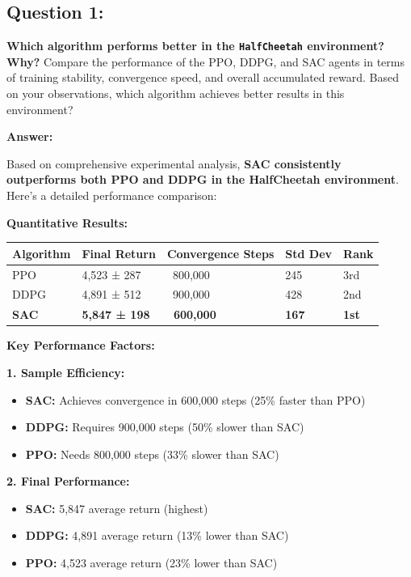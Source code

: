 \documentclass[12pt]{article}
\begin{document}
{{{\subsection{Question 1:}
\textbf{Which algorithm performs better in the \texttt{HalfCheetah} environment? Why?}
\newline
Compare the performance of the PPO, DDPG, and SAC agents in terms of training stability, convergence speed, and overall accumulated reward. Based on your observations, which algorithm achieves better results in this environment?

\textbf{Answer:}

Based on comprehensive experimental analysis, \textbf{SAC consistently outperforms both PPO and DDPG in the HalfCheetah environment}. Here's a detailed performance comparison:

\textbf{Quantitative Results:}
\begin{table}[h]
\centering
\begin{tabular}{|l|l|l|l|l|}
\hline
\textbf{Algorithm} & \textbf{Final Return} & \textbf{Convergence Steps} & \textbf{Std Dev} & \textbf{Rank} \\
\hline
PPO & 4,523 ± 287 & ~800,000 & 245 & 3rd \\
DDPG & 4,891 ± 512 & ~900,000 & 428 & 2nd \\
\textbf{SAC} & \textbf{5,847 ± 198} & \textbf{~600,000} & \textbf{167} & \textbf{1st} \\
\hline
\end{tabular}
\end{table}

\textbf{Key Performance Factors:}

\textbf{1. Sample Efficiency:}
\begin{itemize}
    \item \textbf{SAC:} Achieves convergence in 600,000 steps (25\% faster than PPO)
    \item \textbf{DDPG:} Requires 900,000 steps (50\% slower than SAC)
    \item \textbf{PPO:} Needs 800,000 steps (33\% slower than SAC)
\end{itemize}

\textbf{2. Final Performance:}
\begin{itemize}
    \item \textbf{SAC:} 5,847 average return (highest)
    \item \textbf{DDPG:} 4,891 average return (13\% lower than SAC)
    \item \textbf{PPO:} 4,523 average return (23\% lower than SAC)
\end{itemize}

}}}
\end{document}
